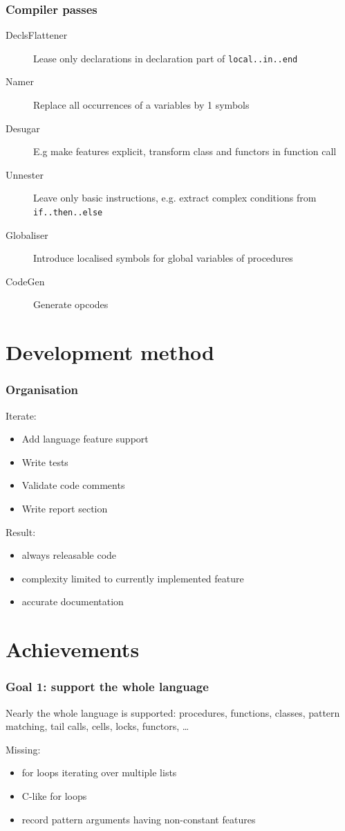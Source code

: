 \documentclass{beamer}
\begin{document}
\begin{frame}
\frametitle{Compiler passes}
\begin{description}
  \item[DeclsFlattener] Lease only declarations in declaration part of \lstinline!local..in..end!
  \item[Namer] Replace all occurrences  of a variables by 1 symbols
  \item[Desugar] E.g make features explicit, transform class and functors in function call
  \item[Unnester] Leave only basic instructions, e.g. extract complex conditions from \lstinline!if..then..else!
  \item[Globaliser] Introduce localised symbols for global variables of procedures
  \item[CodeGen] Generate opcodes
\end{description}
\end{frame}

\section{Development method}

\begin{frame}
\frametitle{Organisation}
Iterate:
\begin{itemize}
  \item Add language feature support
  \item Write tests
  \item Validate code comments
  \item Write report section
\end{itemize}

Result:
\begin{itemize}
  \item always releasable code
  \item complexity limited to currently implemented feature
  \item accurate documentation
\end{itemize}
\end{frame}

\section{Achievements}

\begin{frame}
\frametitle{Goal 1: support the whole language}
Nearly the whole language is supported: procedures, functions, classes, pattern matching, tail calls, cells, locks, functors, \ldots
\vspace{1cm}

Missing:
\begin{itemize}
  \item for loops iterating over multiple lists
  \item C-like for loops
  \item record pattern arguments having non-constant features
\end{itemize}
\end{frame}
\end{document}

